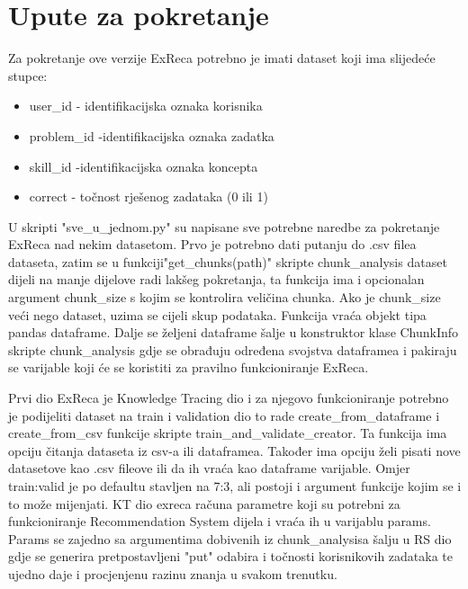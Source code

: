 \section{Upute za pokretanje}

Za pokretanje ove verzije ExReca potrebno je imati dataset koji ima slijedeće stupce:

\begin{itemize}
	 \item user\_id - identifikacijska oznaka korisnika
	 \item problem\_id -identifikacijska oznaka zadatka
	 \item skill\_id -identifikacijska oznaka koncepta
	 \item correct - točnost rješenog zadataka (0 ili 1)
\end{itemize}

U skripti "sve\_u\_jednom.py" su napisane sve potrebne naredbe za pokretanje ExReca nad nekim datasetom.
Prvo je potrebno dati putanju do .csv filea dataseta, zatim se u funkciji"get\_chunks(path)" skripte chunk\_analysis
dataset dijeli na manje dijelove radi lakšeg pokretanja, ta funkcija ima i opcionalan argument chunk\_size s
kojim se kontrolira veličina chunka. Ako je chunk\_size veći nego dataset, uzima se cijeli skup podataka. Funkcija
vraća objekt tipa pandas dataframe. Dalje se željeni dataframe šalje u konstruktor klase ChunkInfo skripte chunk\_analysis
gdje se obrađuju određena svojstva dataframea i pakiraju se varijable koji će se koristiti za pravilno funkcioniranje ExReca.

Prvi dio ExReca je Knowledge Tracing dio i za njegovo funkcioniranje potrebno je podijeliti dataset na train i validation dio
to rade create\_from\_dataframe i create\_from\_csv funkcije skripte train\_and\_validate\_creator. Ta funkcija ima opciju
čitanja dataseta iz csv-a ili dataframea. Također ima opciju želi pisati nove datasetove kao .csv fileove ili da ih vraća
kao dataframe varijable. Omjer train:valid je po defaultu stavljen na 7:3, ali postoji i argument funkcije kojim se i to može mijenjati.
KT dio exreca računa parametre koji su potrebni za funkcioniranje Recommendation System dijela i vraća ih u varijablu params.
Params se zajedno sa argumentima dobivenih iz chunk\_analysisa šalju u RS dio gdje se generira pretpostavljeni "put" odabira i
točnosti korisnikovih zadataka te ujedno daje i procjenjenu razinu znanja u svakom trenutku.



